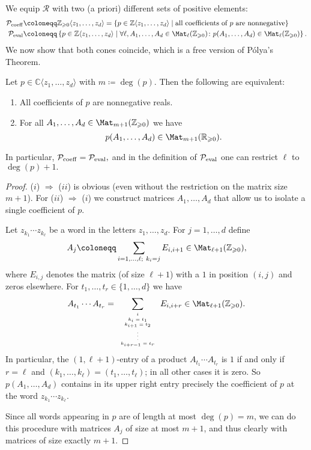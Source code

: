 We equip $\mathcal R$ with two (a priori) different sets of positive elements: 
$$\begin{aligned}\mathcal P_{\rm coeff} &\coloneqq \mathbb Z_{\geqslant  0}\langle z_1,\ldots, z_d\rangle=\left\{ p\in \mathbb Z\langle z_1,\ldots, z_d\rangle\mid\mbox{all coefficients of } p \mbox{ are nonnegative}\right\}\\
\mathcal P_{\rm eval} &\coloneqq \left\{ p\in \mathbb Z\langle z_1,\ldots, z_d\rangle\mid\forall \ell, A_1,\ldots, A_d\in \Mat_\ell(\mathbb Z_{\geqslant 0})\colon p(A_1,\ldots, A_d)\in \Mat_\ell(\mathbb Z_{\geqslant 0})\right\}. \end{aligned}$$
We now show that both cones coincide, which is a free version of P\'olya's Theorem.

\begin{theorem}\label{thm:freePoyla}
Let $p\in\mathbb C\langle z_1,\ldots, z_d\rangle$ with $m \coloneqq \deg(p)$. Then the following are equivalent:
\begin{enumerate}[label=(\roman*)]
\item\label{cond:Polya1} All coefficients of $p$ are nonnegative reals.
\item\label{cond:Polya2} For all  $A_1,\ldots, A_d\in \Mat_{m+1}(\mathbb Z_{\geqslant 0})$ we have
$$p(A_1,\ldots, A_d)\in \Mat_{m+1}(\mathbb R_{\geqslant 0}).$$
\end{enumerate} In particular, $\mathcal P_{\rm coeff}=\mathcal P_{\rm eval},$ and in the definition of $\mathcal P_{\rm eval}$ one can restrict $\ell$ to $\deg(p)+1.$
\end{theorem}
\begin{proof} ($i$) $\Rightarrow$ ($ii$) is obvious (even without the restriction on the matrix size $m+1$). 
For ($ii$) $\Rightarrow$ ($i$) we  construct matrices $A_1,\ldots, A_d$ that allow us to isolate a single coefficient of $p$. 

Let  $z_{k_1}\cdots z_{k_\ell}$ be a word in the letters $z_1,\ldots, z_d$. For $j=1,\ldots, d$ define
$$ A_j \coloneqq \sum_{i=1,\ldots, \ell;\ k_i=j} E_{i,i+1}\in \Mat_{\ell+1}(\mathbb Z_{\geqslant 0}),$$ where $E_{i,j}$ denotes the matrix (of size $\ell+1$) with a $1$ in position $(i,j)$ and zeros elsewhere. For $t_1,\ldots, t_r\in\{1,\ldots, d\}$ we have $$A_{t_1}\cdots A_{t_r}=\sum_{\tiny\begin{array}{c}i \\ k_i=t_1\\k_{i+1}=t_2\\ \vdots \\ k_{i+r-1}=t_r\end{array} }E_{i,i+r}\in \Mat_{\ell+1}(\mathbb Z_{\geqslant 0}).$$ In particular, the $(1,\ell+1)$-entry of a product  $A_{t_1}\cdots A_{t_r}$ is $1$ if and only if 
$r=\ell$ and $(k_1,\ldots, k_\ell)=(t_1,\ldots, t_\ell)$; in all other cases it is zero. So $p(A_1,\ldots, A_d)$ contains in its upper right entry precisely the coefficient of $p$ at the word $z_{k_1}\cdots z_{k_\ell}.$

Since all words appearing in $p$ are of length at most $\deg(p)=m$, we can do this procedure with matrices $A_j$ of size at most $m+1$, and thus clearly with matrices of size exactly $m+1$.
\end{proof}

